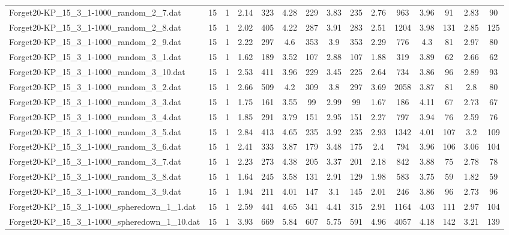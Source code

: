 \begin{table}[!ht]
{\begin{tabular}{lcccccccccccccc}
Forget20-KP\_15\_3\_1-1000\_random\_2\_7.dat & 15 & 1 & 2.14 & 323 & 4.28 & 229 & 3.83 & 235 & 2.76 & 963 & 3.96 & 91 & 2.83 & 90 \\
Forget20-KP\_15\_3\_1-1000\_random\_2\_8.dat & 15 & 1 & 2.02 & 405 & 4.22 & 287 & 3.91 & 283 & 2.51 & 1204 & 3.98 & 131 & 2.85 & 125 \\
Forget20-KP\_15\_3\_1-1000\_random\_2\_9.dat & 15 & 1 & 2.22 & 297 & 4.6 & 353 & 3.9 & 353 & 2.29 & 776 & 4.3 & 81 & 2.97 & 80 \\
Forget20-KP\_15\_3\_1-1000\_random\_3\_1.dat & 15 & 1 & 1.62 & 189 & 3.52 & 107 & 2.88 & 107 & 1.88 & 319 & 3.89 & 62 & 2.66 & 62 \\
Forget20-KP\_15\_3\_1-1000\_random\_3\_10.dat & 15 & 1 & 2.53 & 411 & 3.96 & 229 & 3.45 & 225 & 2.64 & 734 & 3.86 & 96 & 2.89 & 93 \\
Forget20-KP\_15\_3\_1-1000\_random\_3\_2.dat & 15 & 1 & 2.66 & 509 & 4.2 & 309 & 3.8 & 297 & 3.69 & 2058 & 3.87 & 81 & 2.8 & 80 \\
Forget20-KP\_15\_3\_1-1000\_random\_3\_3.dat & 15 & 1 & 1.75 & 161 & 3.55 & 99 & 2.99 & 99 & 1.67 & 186 & 4.11 & 67 & 2.73 & 67 \\
Forget20-KP\_15\_3\_1-1000\_random\_3\_4.dat & 15 & 1 & 1.85 & 291 & 3.79 & 151 & 2.95 & 151 & 2.27 & 797 & 3.94 & 76 & 2.59 & 76 \\
Forget20-KP\_15\_3\_1-1000\_random\_3\_5.dat & 15 & 1 & 2.84 & 413 & 4.65 & 235 & 3.92 & 235 & 2.93 & 1342 & 4.01 & 107 & 3.2 & 109 \\
Forget20-KP\_15\_3\_1-1000\_random\_3\_6.dat & 15 & 1 & 2.41 & 333 & 3.87 & 179 & 3.48 & 175 & 2.4 & 794 & 3.96 & 106 & 3.06 & 104 \\
Forget20-KP\_15\_3\_1-1000\_random\_3\_7.dat & 15 & 1 & 2.23 & 273 & 4.38 & 205 & 3.37 & 201 & 2.18 & 842 & 3.88 & 75 & 2.78 & 78 \\
Forget20-KP\_15\_3\_1-1000\_random\_3\_8.dat & 15 & 1 & 1.64 & 245 & 3.58 & 131 & 2.91 & 129 & 1.98 & 583 & 3.75 & 59 & 1.82 & 59 \\
Forget20-KP\_15\_3\_1-1000\_random\_3\_9.dat & 15 & 1 & 1.94 & 211 & 4.01 & 147 & 3.1 & 145 & 2.01 & 246 & 3.86 & 96 & 2.73 & 96 \\
Forget20-KP\_15\_3\_1-1000\_spheredown\_1\_1.dat & 15 & 1 & 2.59 & 441 & 4.65 & 341 & 4.41 & 315 & 2.91 & 1164 & 4.03 & 111 & 2.97 & 104 \\
Forget20-KP\_15\_3\_1-1000\_spheredown\_1\_10.dat & 15 & 1 & 3.93 & 669 & 5.84 & 607 & 5.75 & 591 & 4.96 & 4057 & 4.18 & 142 & 3.21 & 139 \\

\end{tabular}}
\end{table}
